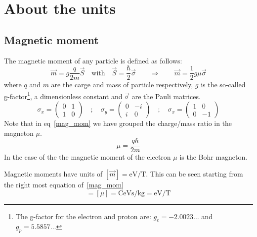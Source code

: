 \chapter{About the units}
\section{Magnetic moment}
The magnetic moment of any particle is defined as follows:
\begin{equation}
  \vec{m} = g\frac{q}{2m}\vec{S} \quad\text{with}\quad
  \vec{S}=\frac{\hbar}{2}\vec{\sigma}\qquad\Rightarrow\qquad
  \vec{m} = \frac{1}{2}g\mu\vec{\sigma}
\label{mag_mom}
\end{equation}
where $q$ and $m$ are the carge and mass of particle respectively, $g$ is the so-called g-factor\footnote{The g-factor for the electron and proton are: $g_e=-2.0023\dots$ and $g_p=5.5857\dots$}, a dimensionless constant and $\vec{\sigma}$ are the Pauli matrices.
\begin{equation}
  \sigma_x=\left(\begin{array}{cc}
    0 & 1 \\
    1 & 0
    \end{array}\right)\quad;\quad
  \sigma_y=\left(\begin{array}{cc}
    0 & -i \\
    i & 0
    \end{array}\right)\quad;\quad
  \sigma_x=\left(\begin{array}{cc}
    1 & 0 \\
    0 & -1
    \end{array}\right)
\label{pauli}
\end{equation}
Note that in eq~\eqref{mag_mom} we have grouped the charge/mass ratio in the magneton $\mu$.
\begin{equation}
  \mu = \frac{q\hbar}{2m}
\end{equation}
In the case of the the magnetic moment of the electron $\mu$ is the Bohr magneton.

Magnetic moments have units of $[\vec{m}]=\si{\eV/\tesla}$. This can be seen starting from the right most equation of~\eqref{mag_mom}
\begin{equation*}
  [\vec{m}] = [\mu] = \si{\coulomb\eV\s\per\kilogram} = \si{\eV\per\tesla}
\end{equation*}


